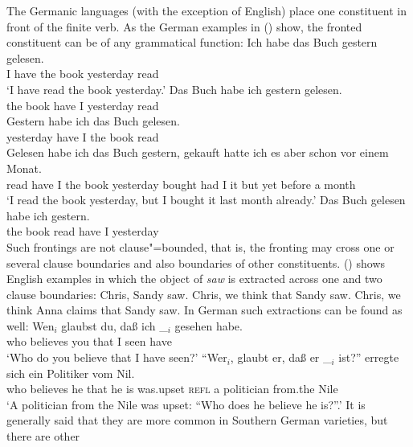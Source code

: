 The Germanic languages (with the exception of English) place one constituent in front of the finite
verb. As the German examples in () show, the fronted constituent can be of any grammatical function:
\eal
\ex 
\gll Ich habe das Buch gestern gelesen.\\
     I have the book yesterday read\\
\glt `I have read the book yesterday.'
\ex 
\gll Das Buch habe ich gestern gelesen.\\
     the book have I yesterday read\\
\ex 
\gll Gestern habe ich das Buch gelesen.\\
     yesterday have I the book read\\
\ex 
\gll Gelesen habe ich das Buch gestern, gekauft hatte ich es aber schon vor einem Monat.\\
     read have I the book yesterday bought had I it but yet before a month\\
\glt `I read the book yesterday, but I bought it last month already.'
\ex 
\gll Das Buch gelesen habe ich gestern.\\
     the book read    have I yesterday\\
\zl
Such frontings are not clause"=bounded, that is, the fronting may cross one or several clause boundaries
and also boundaries of other constituents. () shows English examples in which the object of
\emph{saw} is extracted across one and two clause boundaries:
\eal
\ex\label{ex-chris-we-saw} Chris, Sandy saw.
\ex\label{ex-chris-we-think-that-sandy-saw} Chris, we think that Sandy saw.
\ex Chris, we think Anna claims that Sandy saw.
\zl
In German such extractions can be found as well:
\eal
\label{ex-fernabhaengigkeit-one}
\ex
\label{ex-wen-glaubst-du-dass}
\gll Wen$_i$ glaubst du, daß ich \_$_i$ gesehen habe.\footnotemark\\
     who believes you that I {} seen have\\\german
{}
\glt `Who do you believe that I have seen?'
\ex 
\gll "`Wer$_i$, glaubt er, daß er \_$_i$ ist?"' erregte sich ein Politiker vom Nil.\footnotemark\\
     \hphantom{"`}who believes he that he {} is was.upset \textsc{refl} a politician from.the Nile\\
\glt `A politician from the Nile was upset: ``Who does he believe he is?''.'
\zl
It is generally said that they are more common in Southern German varieties, but there are other
